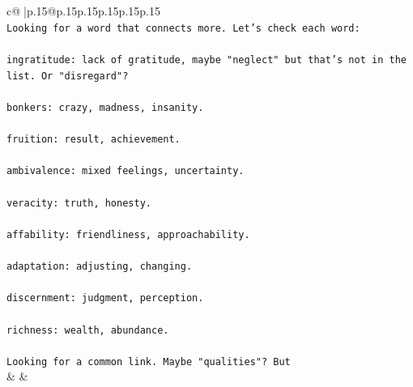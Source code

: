 \documentclass{article}
\begin{document}
{\begin{supertabular}{c@{$\;$}|p{.15\linewidth}@{}p{.15\linewidth}p{.15\linewidth}p{.15\linewidth}p{.15\linewidth}p{.15\linewidth}}
{{{\\ 
\texttt{Looking for a word that connects more. Let's check each word:} \\
\\ 
\texttt{ingratitude: lack of gratitude, maybe "neglect" but that's not in the list. Or "disregard"?} \\
\\ 
\texttt{bonkers: crazy, madness, insanity.} \\
\\ 
\texttt{fruition: result, achievement.} \\
\\ 
\texttt{ambivalence: mixed feelings, uncertainty.} \\
\\ 
\texttt{veracity: truth, honesty.} \\
\\ 
\texttt{affability: friendliness, approachability.} \\
\\ 
\texttt{adaptation: adjusting, changing.} \\
\\ 
\texttt{discernment: judgment, perception.} \\
\\ 
\texttt{richness: wealth, abundance.} \\
\\ 
\texttt{Looking for a common link. Maybe "qualities"? But} \\
            }
        }
    }
    & & \\ \\


\end{supertabular}}
\end{document}
